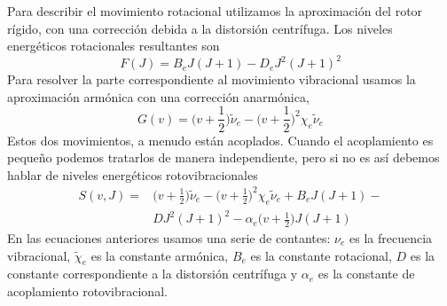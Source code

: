 \documentclass{tufte-book}
\begin{document}
Para describir el movimiento rotacional utilizamos la
aproximación del rotor rígido, con una corrección debida
a la distorsión centrífuga. Los niveles energéticos 
rotacionales resultantes son
\begin{equation}
    F(J)=B_eJ(J+1) - D_eJ^2(J+1)^2
\end{equation}
Para resolver la parte correspondiente al movimiento 
vibracional usamos la aproximación armónica con una 
corrección anarmónica,
\begin{equation}
    G(v)=\bigg(v+\frac{1}{2}\bigg)\tilde{\nu}_e - 
    \bigg(v+\frac{1}{2}\bigg)^2\chi_e\tilde{\nu}_e
\end{equation}
Estos dos movimientos, a menudo están acoplados. Cuando
el acoplamiento es pequeño podemos tratarlos de manera
independiente, pero si no es así debemos hablar de 
niveles energéticos rotovibracionales
\begin{equation}
    \begin{split}
        S(v,J)=&\bigg(v+\frac{1}{2}\bigg)\tilde{\nu}_e − 
        \bigg(v+\frac{1}{2}\bigg)^2\chi_e\tilde{\nu}_e +
        B_eJ(J+1) - \\ & DJ^2(J+1)^2 -
        \alpha_e\bigg(v+\frac{1}{2}\bigg)J(J+1)
    \end{split}
\end{equation}
En las ecuaciones anteriores usamos una serie de contantes:
$\nu_e$ es la frecuencia vibracional, $\tilde{\chi}_e$ es la
constante armónica, $B_e$ es la constante rotacional, $D$
es la constante correspondiente a la distorsión centrífuga 
y $\alpha_e$ es la constante de acoplamiento rotovibracional.
\end{document}
